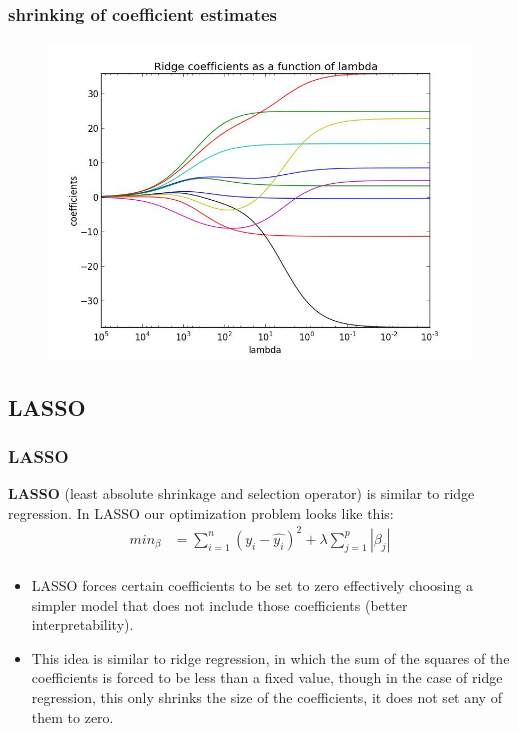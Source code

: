\documentclass{beamer}
\begin{document}
\begin{frame}
\frametitle{shrinking of coefficient estimates}
\begin{figure}
\includegraphics[width=0.8\linewidth]{figures/03/ridge.jpeg}
\end{figure}
\end{frame}
\subsection{LASSO}
\begin{frame}
\frametitle{LASSO}
\textbf{LASSO} (least absolute shrinkage and selection operator) is similar to ridge regression. In LASSO our optimization problem looks like this: 
\begin{align*} 
min_{\beta} &= \sum_{i=1}^n (y_i - \hat{y_i})^2 + \lambda \sum_{j=1}^p |\beta_j| \\
\end{align*}



\begin{itemize}
\item LASSO forces certain coefficients to be set to zero effectively choosing a simpler model that does not include those coefficients (better interpretability).
\item This idea is similar to ridge regression, in which the sum of the squares of the coefficients is forced to be less than a fixed value, though in the case of ridge regression, this only shrinks the size of the coefficients, it does not set any of them to zero.
\end{itemize}

\end{frame}
\end{document}

